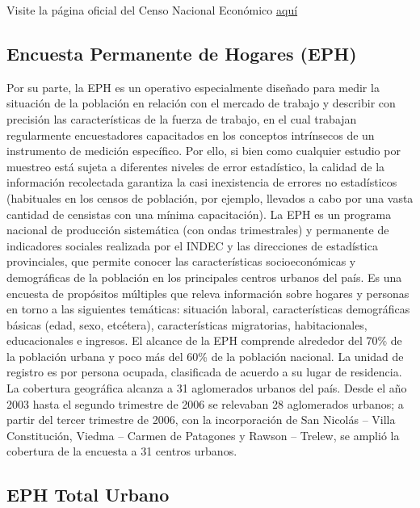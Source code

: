 \documentclass[
  openany]{book}
\begin{document}
Visite la página oficial del Censo Nacional Económico \href{https://censoeconomico.indec.gob.ar/}{aquí}

\hypertarget{encuesta-permanente-de-hogares-eph}{%
\subsection{Encuesta Permanente de Hogares (EPH)}\label{encuesta-permanente-de-hogares-eph}}

Por su parte, la EPH es un operativo especialmente diseñado para medir la situación de la población en relación con el mercado de trabajo y describir con precisión las características de la fuerza de trabajo, en el cual trabajan regularmente encuestadores capacitados en los conceptos intrínsecos de un instrumento de medición específico.
Por ello, si bien como cualquier estudio por muestreo está sujeta a diferentes niveles de error estadístico, la calidad de la información recolectada garantiza la casi inexistencia de errores no estadísticos (habituales en los censos de población, por ejemplo, llevados a cabo por una vasta cantidad de censistas con una mínima capacitación).
La EPH es un programa nacional de producción sistemática (con ondas trimestrales) y permanente de indicadores sociales realizada por el INDEC y las direcciones de estadística provinciales, que permite conocer las características socioeconómicas y demográficas de la población en los principales centros urbanos del país.
Es una encuesta de propósitos múltiples que releva información sobre hogares y personas en torno a las siguientes temáticas: situación laboral, características demográficas básicas (edad, sexo, etcétera), características migratorias, habitacionales, educacionales e ingresos.
El alcance de la EPH comprende alrededor del 70\% de la población urbana y poco más del 60\% de la población nacional.
La unidad de registro es por persona ocupada, clasificada de acuerdo a su lugar de residencia.
La cobertura geográfica alcanza a 31 aglomerados urbanos del país.
Desde el año 2003 hasta el segundo trimestre de 2006 se relevaban 28 aglomerados urbanos; a partir del tercer trimestre de 2006, con la incorporación de San Nicolás -- Villa Constitución, Viedma -- Carmen de Patagones y Rawson -- Trelew, se amplió la cobertura de la encuesta a 31 centros urbanos.

\hypertarget{eph-total-urbano}{%
\subsection{EPH Total Urbano}\label{eph-total-urbano}}
\end{document}
